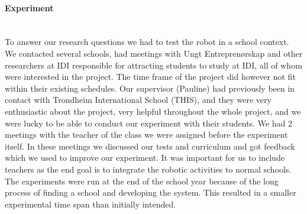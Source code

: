 \paragraph{Experiment}~\\
To answer our research questions we had to test the robot in a school context. We contacted several schools, had meetings with Ungt Entreprenørskap and other researchers at IDI responsible for attracting students to study at IDI, all of whom were interested in the project. The time frame of the project did however not fit within their existing schedules. Our supervisor (Pauline) had previously been in contact with Trondheim International School (THIS), and they were very enthusiastic about the project, very helpful throughout the whole project, and we were lucky to be able to conduct our experiment with their students. 
We had 2 meetings with the teacher of the class we were assigned before the experiment itself. In these meetings we discussed our tests and curriculum and got feedback which we used to improve our experiment. It was important for us to include teachers as the end goal is to integrate the robotic activities to normal schools.
The experiments were run at the end of the school year because of the long process of finding a school and developing the system. This resulted in a smaller experimental time span than initially intended.

